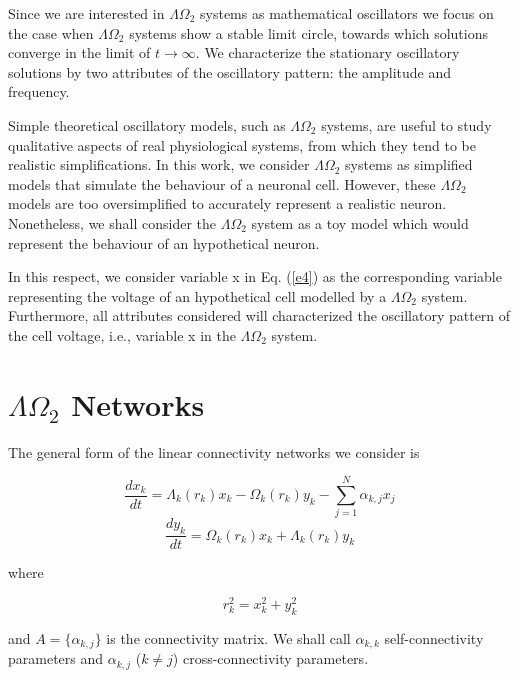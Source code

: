 Since we are interested in $\Lambda \Omega_{2}$ systems as mathematical oscillators we focus on the case when $\Lambda \Omega_{2}$ systems show a stable limit circle, towards which solutions converge in the limit of $t\rightarrow \infty$. We characterize the stationary oscillatory solutions by two attributes of the oscillatory pattern: the amplitude and frequency.

Simple theoretical oscillatory models, such as $\Lambda \Omega_{2}$ systems, are useful to study qualitative aspects of real physiological systems, from which they tend to be realistic simplifications. In this work, we consider $\Lambda \Omega_{2}$ systems as simplified models that simulate the behaviour of a neuronal cell. However, these $\Lambda \Omega_{2}$ models are too oversimplified to accurately represent a realistic neuron. Nonetheless, we shall consider the $\Lambda \Omega_{2}$ system as a toy model which would represent the behaviour of an hypothetical neuron.

In this respect, we consider variable x in Eq. (\ref{e4}) as the corresponding variable representing the voltage of an hypothetical cell modelled by a $\Lambda \Omega_{2}$ system. Furthermore, all attributes considered will characterized the oscillatory pattern of the cell voltage, i.e., variable x in the $\Lambda \Omega_{2}$ system.

\section{$\Lambda \Omega_{2}$ Networks}
The general form of the linear connectivity networks we consider is

\begin{equation}
    \frac{dx_{k}}{dt} = \Lambda_{k}(r_{k})x_{k} - \Omega_{k}(r_{k})y_{k} - \sum_{j=1}^{N}\alpha_{k,j}x_{j}
    \label{e10}
\end{equation}
\begin{equation}
    \frac{dy_{k}}{dt} = \Omega_{k}(r_{k})x_{k} + \Lambda_{k}(r_{k})y_{k}
    \label{e11}
\end{equation}

where

\begin{equation}
r_{k}^{2}=x_{k}^{2}+y_{k}^{2}
\label{e12}
\end{equation}

and $A=\{\alpha_{k,j}\}$ is the connectivity matrix. We shall call $\alpha_{k,k}$ self-connectivity parameters and $\alpha_{k,j}$ ($k \neq j$) cross-connectivity parameters.

